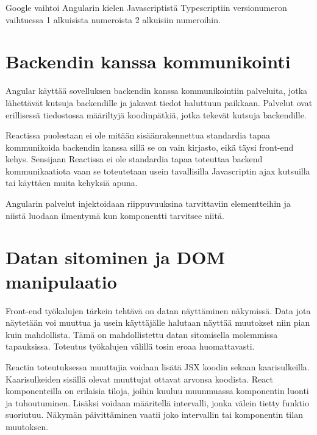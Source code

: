 \documentclass[a4paper,12pt,twoside]{article} %
\begin{document}
\vspace{4mm}\noindent
Google vaihtoi Angularin kielen Javascriptistä Typescriptiin versionumeron vaihtuessa 1 alkuisista numeroista 2 alkuisiin numeroihin.

\newpage


\section{Backendin kanssa kommunikointi}

Angular käyttää sovelluksen backendin kanssa kommunikointiin palveluita, jotka lähettävät kutsuja backendille ja jakavat tiedot haluttuun paikkaan. Palvelut ovat erillisessä tiedostossa määriltyjä koodinpätkiä, jotka tekevät kutsuja backendille.

\vspace{4mm}\noindent
Reactissa puolestaan ei ole mitään sisäänrakennettua standardia tapaa kommunikoida backendin kanssa sillä se on vain kirjasto, eikä täysi front-end kehys. Sensijaan Reactissa ei ole standardia tapaa toteuttaa backend kommunikaatiota vaan se toteutetaan usein tavallisilla Javascriptin ajax kutsuilla tai käyttäen muita kehyksiä apuna.

\vspace{4mm}\noindent
Angularin palvelut injektoidaan riippuvuuksina tarvittaviin elementteihin ja niistä luodaan ilmentymä kun komponentti tarvitsee niitä. 

\newpage

\section{Datan sitominen ja DOM manipulaatio}

Front-end työkalujen tärkein tehtävä on datan näyttäminen näkymissä. Data jota näytetään voi muuttua ja usein käyttäjälle halutaan näyttää muutokset niin pian kuin mahdollista. Tämä on mahdollistettu datan sitomisella molemmissa tapauksissa. Toteutus työkalujen välillä tosin eroaa huomattavasti.

\vspace{4mm}\noindent Reactin toteutuksessa muuttujia voidaan lisätä JSX koodin sekaan kaarisulkeilla. Kaarisulkeiden sisällä olevat muuttujat ottavat arvonsa koodista. React komponenteilla on erilaisia tiloja, joihin kuuluu muunmuassa komponentin luonti ja tuhoutuminen. Lisäksi voidaan määritellä intervalli, jonka välein tietty funktio suoriutuu. Näkymän päivittäminen vaatii joko intervallin tai komponentin tilan muutoksen.
\end{document}
